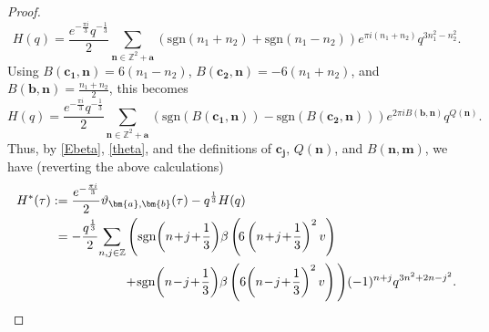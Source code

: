 \documentclass[12pt,reqno]{amsart}
\renewcommand{\b}{\beta}
\renewcommand{\t}{\tau}
\renewcommand{\(}{\left\(}
\renewcommand{\)}{\right\)}
\numberwithin{equation}{section}
\theoremstyle{plain}
\theoremstyle{definition}
\numberwithin{equation}{section}
\begin{document}
\begin{proof}
\begin{equation*}%
H(q)=\frac{e^{-\frac{\pi i}{3}}q^{-\frac 13}}{2}\!\sum_{\bm{n}\in \mathbb{Z}^2+\bm{a}} \left(\text{sgn}\left(n_1+n_2\right)+\text{sgn}\left(n_1-n_2\right)\right)e^{\pi i\left(n_1+n_2\right)}q^{3n^2_1-n^2_2}.
\end{equation*}
Using $B(\bm{c_1},\bm{n})=6(n_1-n_2)$, $B(\bm{c_2},\bm{n})=-6(n_1+n_2)$, and $B(\bm{b},\bm{n})=\frac{n_1+n_2}{2}$, this becomes  %
\[
H(q)=\frac{e^{-\frac{\pi i}{3}}q^{-\frac 13}}{2}\!\sum_{\bm{n}\in \mathbb{Z}^2+\bm{a}}\left(\text{sgn}\left(B\left(\bm{c_1},\bm{n}\right)\right)-\text{sgn}\left(B\left(\bm{c_2},\bm{n}\right)\right)\right)e^{2\pi i B\left(\bm{b}, \bm{n}\right)}q^{Q\left(\bm{n}\right)}.
\]
Thus, by \eqref{Ebeta}, \eqref{theta}, and the definitions of $\bm{c_j},\, Q(\bm{n})$, and  $B(\bm{n},\bm{m})$, we have (reverting the above calculations) 
\begin{align*}
H^*(\t)&:=\frac{e^{-\frac{\pi i}{3}}}{2}\vartheta_{\bm{a},\bm{b}}(\t)-q^{\frac 13}H(q)\\
&\hspace{0.1 cm}=-\frac{q^{\frac 13}}2\!\sum_{n,j\in \mathbb{Z}}\Bigg(\textnormal{sgn}\!\left(n\!+\!j\!+\!\frac 13\right)\!\b\left(\!6\left(n\!+\!j\!+\!\frac 13\right)^2v\right)\\%
&\hspace{2 cm}+\!\textnormal{sgn}\!\left(n\!-\!j\!+\!\frac 13\right)\!\b\left(6\!\left(n\!-\!j\!+\!\frac 13\right)^2 v\right)\Bigg)(-1)^{n+j}q^{3n^2+2n-j^2}.
\end{align*}


\end{proof}
\end{document}
